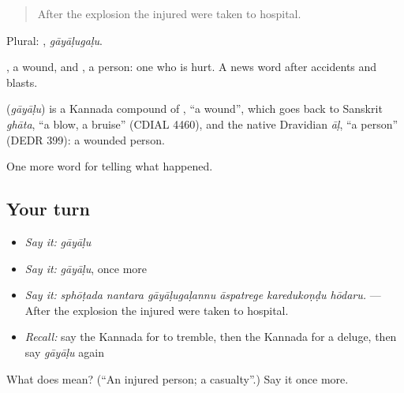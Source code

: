 \begin{quote}
After the explosion the injured were taken to hospital.
\end{quote}

Plural: , \emph{gāyāḷugaḷu}.

, a wound, and , a person: one who is hurt. A news word after accidents and blasts.

\begin{cousinweb}
\textbf{} (\emph{gāyāḷu}) is a Kannada compound of , \textquotedblleft{}a wound\textquotedblright{}, which goes back to Sanskrit \emph{ghāta}, \textquotedblleft{}a blow, a bruise\textquotedblright{} (CDIAL 4460), and the native Dravidian \emph{āḷ}, \textquotedblleft{}a person\textquotedblright{} (DEDR 399): a wounded person.
\end{cousinweb}

\begin{grammarlens}[title={What you've built}]
One more word for telling what happened.
\end{grammarlens}

\subsection*{Your turn}
\begin{itemize}
\raggedright
  \item \emph{Say it:} \emph{gāyāḷu}
  \item \emph{Say it:} \emph{gāyāḷu}, once more
  \item \emph{Say it:} \emph{sphōṭada nantara gāyāḷugaḷannu āspatrege karedukoṇḍu hōdaru.} — After the explosion the injured were taken to hospital.
  \item \emph{Recall:} say the Kannada for to tremble, then the Kannada for a deluge, then say \emph{gāyāḷu} again
\end{itemize}

\begin{tcolorbox}[breakable,colback=teal!4,colframe=teal!35!black,title={Before you move on}]
What does  mean? (\textquotedblleft{}An injured person; a casualty\textquotedblright{}.) Say it once more.
\end{tcolorbox}
